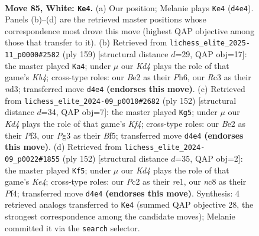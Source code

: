 \documentclass[11pt]{article}
\begin{document}
\clearpage

\begin{figure}[p]\centering
\begin{subfigure}{0.46\textwidth}\centering
\resizebox{\linewidth}{!}{%
\newchessgame
\chessboard[
  setfen={2n3r1/8/P2k4/8/3K4/2R3PP/2P1B3/8 w - - 3 85},
  showmover=false,
  pgfstyle=straightmove, color=movearrow, markmove={d4-e4}
]}
\caption{}
\end{subfigure}\hfill
\begin{subfigure}{0.46\textwidth}\centering
\resizebox{\linewidth}{!}{%
\newchessgame
\chessboard[
  setfen={8/8/1p5p/1k6/3K4/3N4/1p5r/5R2 b - - 1 80},
  showmover=false,
  pgfstyle=straightmove, color=movearrow, markmove={b5-a4}
]}
\caption{}
\end{subfigure}
\\[4pt]
\begin{subfigure}{0.46\textwidth}\centering
\resizebox{\linewidth}{!}{%
\newchessgame
\chessboard[
  setfen={3r3k/2p2R1P/8/5B2/1p3K2/1P3P2/8/8 w - - 4 77},
  showmover=false,
  pgfstyle=straightmove, color=movearrow, markmove={f4-g5}
]}
\caption{}
\end{subfigure}\hfill
\begin{subfigure}{0.46\textwidth}\centering
\resizebox{\linewidth}{!}{%
\newchessgame
\chessboard[
  setfen={8/p1P4R/3k4/P7/4KP2/8/8/4r3 w - - 9 77},
  showmover=false,
  pgfstyle=straightmove, color=movearrow, markmove={e4-f5}
]}
\caption{}
\end{subfigure}
\caption{\textbf{Move 85, White: \texttt{Ke4}.} (a) Our position; Melanie plays \texttt{Ke4} (\texttt{d4e4}). Panels (b)--(d) are the retrieved master positions whose correspondence most drove this move (highest QAP objective among those that transfer to it). (b) Retrieved from \texttt{lichess\_elite\_2025-11\_p0000\#2582} (ply 159) [structural distance $d$=29, QAP obj=17]: the master played \texttt{Ka4}; under $\mu$ our \emph{Kd4} plays the role of that game's \emph{Kb4}; cross-type roles: our \emph{B}e2 as their \emph{P}h6, our \emph{R}c3 as their \emph{n}d3; transferred move \texttt{d4e4} \textbf{(endorses this move)}. (c) Retrieved from \texttt{lichess\_elite\_2024-09\_p0010\#2682} (ply 152) [structural distance $d$=34, QAP obj=7]: the master played \texttt{Kg5}; under $\mu$ our \emph{Kd4} plays the role of that game's \emph{Kf4}; cross-type roles: our \emph{B}e2 as their \emph{P}f3, our \emph{P}g3 as their \emph{B}f5; transferred move \texttt{d4e4} \textbf{(endorses this move)}. (d) Retrieved from \texttt{lichess\_elite\_2024-09\_p0022\#1855} (ply 152) [structural distance $d$=35, QAP obj=2]: the master played \texttt{Kf5}; under $\mu$ our \emph{Kd4} plays the role of that game's \emph{Ke4}; cross-type roles: our \emph{P}c2 as their \emph{r}e1, our \emph{n}c8 as their \emph{P}f4; transferred move \texttt{d4e4} \textbf{(endorses this move)}. Synthesis: 4 retrieved analogs transferred to \texttt{Ke4} (summed QAP objective 28, the strongest correspondence among the candidate moves); Melanie committed it via the \texttt{search} selector.}
\label{fig:thought-m168}
\end{figure}
\end{document}
